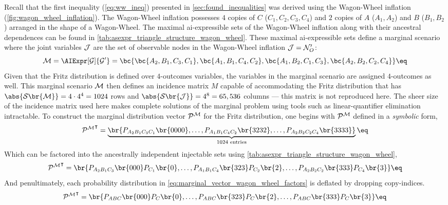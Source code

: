 \documentclass[aps, 10pt, english, twoside, pra, nofootinbib, tightenlines, longbibliography, superscriptaddress]{revtex4-1}
\renewcommand{\Events}[1]{\mathcal{S}\br{#1}} %
\begin{document}
    Recall that the first inequality (\cref{eq:ww_ineq}) presented in \cref{sec:found_inequalities} was derived using the Wagon-Wheel inflation (\cref{fig:wagon_wheel_inflation}). The Wagon-Wheel inflation possesses $4$ copies of $C$ ($C_1, C_2, C_3, C_4$) and $2$ copies of $A$ ($A_1, A_2$) and $B$ ($B_1, B_2$) arranged in the shape of a Wagon-Wheel. The maximal ai-expressible sets of the Wagon-Wheel inflation along with their ancestral dependences can be found in \cref{tab:asexpr_triangle_structure_wagon_wheel}. These maximal ai-expressible sets define a marginal scenario where the joint variables $\mathcal{J}$ are the set of observable nodes in the Wagon-Wheel inflation $\mathcal{J} = \mathcal{N}'_O$:
    \[ \mscenario = \AIExpr[\graph]{\graph'} = \bc{\bc{A_2, B_1, C_3, C_1}, \bc{A_1, B_1, C_4, C_2}, \bc{A_1, B_2, C_1, C_3}, \bc{A_2, B_2, C_2, C_4}} \eq \label{eq:wagon_wheel_marginal_model}\]
    Given that the Fritz distribution is defined over $4$-outcomes variables, the variables in the marginal scenario are assigned $4$-outcomes as well. This marginal scenario $\mathcal{M}$ then defines an incidence matrix $M$ capable of accommodating the Fritz distribution that has $\abs{\Events{\mscenario}} = 4 \cdot 4^{4} = 1024$ rows and $\abs{\Events{\jointvar}} = 4^8 = 65,536$ columns --- this matrix is not reproduced here. The sheer size of the incidence matrix used here makes complete solutions of the marginal problem using tools such as linear-quantifier elimination intractable. To construct the marginal distribution vector $\probvec^{\mscenario}$ for the Fritz distribution, one begins with $\probvec^{\mscenario}$ defined in a \textit{symbolic} form,
    \[ {\probvec^{\mscenario}}^{\intercal} = \underbrace{\br{\prob[A_2B_1C_3C_1]\br{0000}, \ldots, \prob[A_1B_1C_4C_2]\br{3232}, \ldots, \prob[A_2B_2C_2C_4]\br{3333}}}_{1024 \text{ entries}} \eq \label{eq:marginal_vector_wagon_wheel} \]
    Which can be factored into the ancestrally independent injectable sets using \cref{tab:asexpr_triangle_structure_wagon_wheel},
    \[ {\probvec^{\mscenario}}^{\intercal} = \br{\prob[A_2B_1C_3]\br{000}\prob[C_1]\br{0}, \ldots, \prob[A_1B_1C_4]\br{323}\prob[C_2]\br{2}, \ldots, \prob[A_2B_2C_2]\br{333}\prob[C_4]\br{3}} \eq \label{eq:marginal_vector_wagon_wheel_factors}\]
    And penultimately, each probability distribution in \cref{eq:marginal_vector_wagon_wheel_factors} is deflated by dropping copy-indices.
    \[ {\probvec^{\mscenario}}^{\intercal} = \br{\prob[ABC]\br{000}\prob[C]\br{0}, \ldots, \prob[ABC]\br{323}\prob[C]\br{2}, \ldots, \prob[ABC]\br{333}\prob[C]\br{3}} \eq \label{eq:marginal_vector_wagon_wheel_factors_dropped}\]
\end{document}
